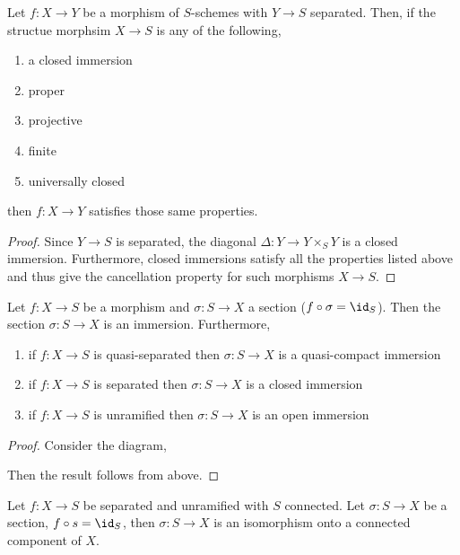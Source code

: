 \documentclass[12pt]{article}
\begin{document}
\begin{cor}
Let $f : X \to Y$ be a morphism of $S$-schemes with $Y \to S$ separated. Then, if the structue morphsim $X \to S$ is any of the following,
\begin{enumerate}
\item a closed immersion
\item proper
\item projective
\item finite
\item universally closed 
\end{enumerate}
then $f : X \to Y$ satisfies those same properties.
\end{cor}

\begin{proof}
Since $Y \to S$ is separated, the diagonal $\Delta : Y \to Y \times_S Y$ is a closed immersion. Furthermore, closed immersions satisfy all the properties listed above and thus give the cancellation property for such morphisms $X \to S$.
\end{proof}

\begin{cor}
Let $f : X \to S$ be a morphism and $\sigma : S \to X$ a section ($f \circ \sigma = \id_S$). Then the section $\sigma : S \to X$ is an immersion. Furthermore,
\begin{enumerate}
\item if $f : X \to S$ is quasi-separated then $\sigma : S \to X$ is a quasi-compact immersion
\item if $f : X \to S$ is separated then $\sigma : S \to X$ is a closed immersion
\item if $f : X \to S$ is unramified then $\sigma : S \to X$ is an open immersion 
\end{enumerate}
\end{cor}

\begin{proof}
Consider the diagram,
\begin{center}
\end{center}
Then the result follows from above.
\end{proof}

\begin{cor}
Let $f : X \to S$ be separated and unramified with $S$ connected. Let $\sigma : S \to X$ be a section, $f \circ s = \id_S$, then $\sigma : S \to X$ is an isomorphism onto a connected component of $X$.
\end{cor}
\end{document}
